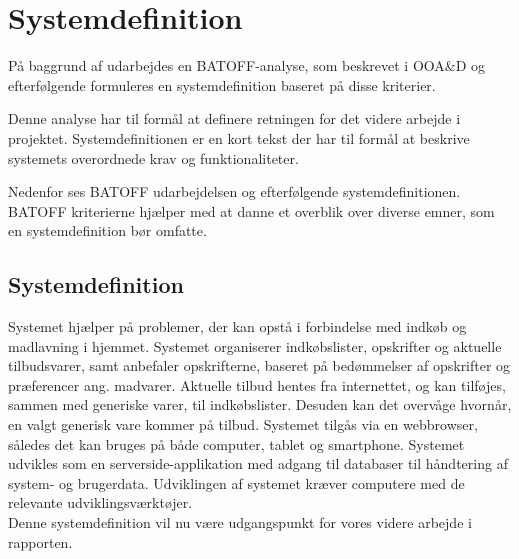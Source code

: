 \section{Systemdefinition}
På baggrund af  udarbejdes en BATOFF-analyse, som beskrevet i OOA\&D\citep{OOA&D2001} og efterfølgende formuleres en systemdefinition baseret på disse kriterier.

Denne analyse har til formål at definere retningen for det videre arbejde i projektet.
Systemdefinitionen er en kort tekst der har til formål at beskrive systemets overordnede krav og funktionaliteter.

Nedenfor ses BATOFF udarbejdelsen og efterfølgende systemdefinitionen.
BATOFF kriterierne hjælper med at danne et overblik over diverse emner, som en systemdefinition bør omfatte.




\subsection{Systemdefinition}\label{Sysdef}

Systemet hjælper på problemer, der kan opstå i forbindelse med indkøb og madlavning i hjemmet.
Systemet organiserer indkøbslister, opskrifter og aktuelle tilbudsvarer, samt anbefaler opskrifterne, baseret på bedømmelser af opskrifter og præferencer ang. madvarer.
Aktuelle tilbud hentes fra internettet, og kan tilføjes, sammen med generiske varer, til indkøbslister.
Desuden kan det overvåge hvornår, en valgt generisk vare kommer på tilbud.
Systemet tilgås via en webbrowser, således det kan bruges på både computer, tablet og smartphone.
Systemet udvikles som en serverside-applikation med adgang til databaser til håndtering af system- og brugerdata.
Udviklingen af systemet kræver computere med de relevante udviklingsværktøjer.\\

Denne systemdefinition vil nu være udgangspunkt for vores videre arbejde i rapporten.
